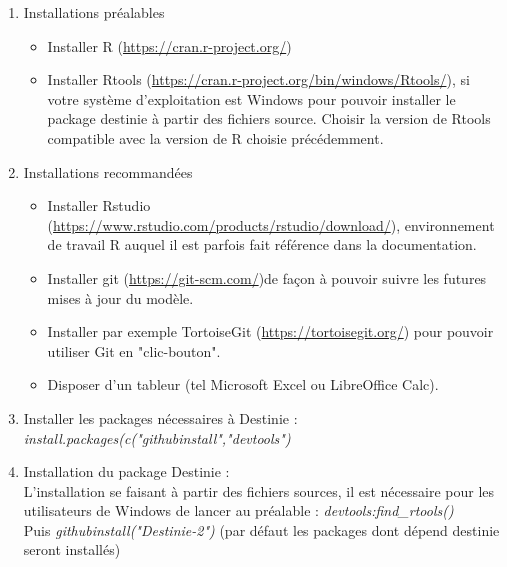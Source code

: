 \begin{enumerate}

\item Installations préalables 
\begin{itemize}
\item Installer	R (\url{https://cran.r-project.org/}) 
\item Installer	Rtools (\url{https://cran.r-project.org/bin/windows/Rtools/}), si votre système d'exploitation est Windows pour pouvoir installer le package destinie à partir des fichiers source. Choisir la version de Rtools compatible avec la version de R choisie précédemment. 
\end{itemize}



\item Installations recommandées 
\begin{itemize}
\item Installer	Rstudio (\url{https://www.rstudio.com/products/rstudio/download/}), environnement de travail R auquel il est parfois fait référence dans la documentation.
\item Installer git (\url{https://git-scm.com/})de façon à pouvoir suivre les futures mises à jour du modèle.
\item Installer par exemple TortoiseGit (\url{https://tortoisegit.org/}) pour pouvoir utiliser Git en "clic-bouton".
\item Disposer d'un tableur (tel Microsoft Excel ou LibreOffice Calc).
\end{itemize}

\item Installer les packages nécessaires à Destinie :\\
\textit{install.packages(c("githubinstall","devtools")}
\item Installation du package Destinie :\\
L'installation se faisant à partir des fichiers sources, il est nécessaire pour les utilisateurs de Windows de lancer au préalable : \textit{devtools:find\_rtools()} \\
Puis \textit{githubinstall("Destinie-2")} (par défaut les packages dont dépend destinie seront installés)

\end{enumerate}

